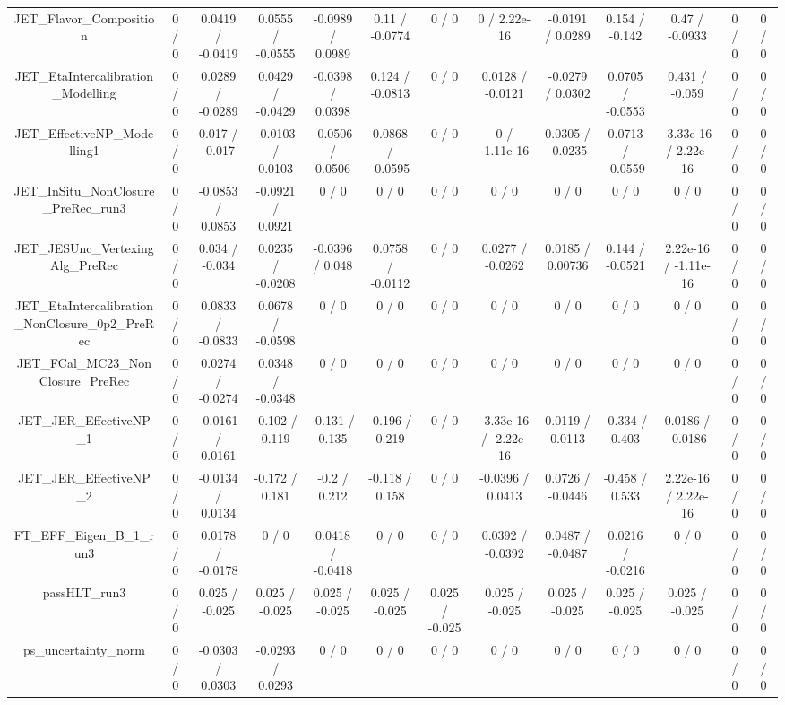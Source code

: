\documentclass[10pt]{article}
\begin{document}
\begin{table}[htbp]
\begin{center}
\begin{tabular}{|c|c|c|c|c|c|c|c|c|c|c|c|c|}
  JET_Flavor_Composition & 0 / 0 & 0.0419 / -0.0419 & 0.0555 / -0.0555 & -0.0989 / 0.0989 & 0.11 / -0.0774 & 0 / 0 & 0 / 2.22e-16 & -0.0191 / 0.0289 & 0.154 / -0.142 & 0.47 / -0.0933 & 0 / 0 & 0 / 0 \\ 
  JET_EtaIntercalibration_Modelling & 0 / 0 & 0.0289 / -0.0289 & 0.0429 / -0.0429 & -0.0398 / 0.0398 & 0.124 / -0.0813 & 0 / 0 & 0.0128 / -0.0121 & -0.0279 / 0.0302 & 0.0705 / -0.0553 & 0.431 / -0.059 & 0 / 0 & 0 / 0 \\ 
  JET_EffectiveNP_Modelling1 & 0 / 0 & 0.017 / -0.017 & -0.0103 / 0.0103 & -0.0506 / 0.0506 & 0.0868 / -0.0595 & 0 / 0 & 0 / -1.11e-16 & 0.0305 / -0.0235 & 0.0713 / -0.0559 & -3.33e-16 / 2.22e-16 & 0 / 0 & 0 / 0 \\ 
  JET_InSitu_NonClosure_PreRec_run3 & 0 / 0 & -0.0853 / 0.0853 & -0.0921 / 0.0921 & 0 / 0 & 0 / 0 & 0 / 0 & 0 / 0 & 0 / 0 & 0 / 0 & 0 / 0 & 0 / 0 & 0 / 0 \\ 
  JET_JESUnc_VertexingAlg_PreRec & 0 / 0 & 0.034 / -0.034 & 0.0235 / -0.0208 & -0.0396 / 0.048 & 0.0758 / -0.0112 & 0 / 0 & 0.0277 / -0.0262 & 0.0185 / 0.00736 & 0.144 / -0.0521 & 2.22e-16 / -1.11e-16 & 0 / 0 & 0 / 0 \\ 
  JET_EtaIntercalibration_NonClosure_0p2_PreRec & 0 / 0 & 0.0833 / -0.0833 & 0.0678 / -0.0598 & 0 / 0 & 0 / 0 & 0 / 0 & 0 / 0 & 0 / 0 & 0 / 0 & 0 / 0 & 0 / 0 & 0 / 0 \\ 
  JET_FCal_MC23_NonClosure_PreRec & 0 / 0 & 0.0274 / -0.0274 & 0.0348 / -0.0348 & 0 / 0 & 0 / 0 & 0 / 0 & 0 / 0 & 0 / 0 & 0 / 0 & 0 / 0 & 0 / 0 & 0 / 0 \\ 
  JET_JER_EffectiveNP_1 & 0 / 0 & -0.0161 / 0.0161 & -0.102 / 0.119 & -0.131 / 0.135 & -0.196 / 0.219 & 0 / 0 & -3.33e-16 / -2.22e-16 & 0.0119 / 0.0113 & -0.334 / 0.403 & 0.0186 / -0.0186 & 0 / 0 & 0 / 0 \\ 
  JET_JER_EffectiveNP_2 & 0 / 0 & -0.0134 / 0.0134 & -0.172 / 0.181 & -0.2 / 0.212 & -0.118 / 0.158 & 0 / 0 & -0.0396 / 0.0413 & 0.0726 / -0.0446 & -0.458 / 0.533 & 2.22e-16 / 2.22e-16 & 0 / 0 & 0 / 0 \\ 
  FT_EFF_Eigen_B_1_run3 & 0 / 0 & 0.0178 / -0.0178 & 0 / 0 & 0.0418 / -0.0418 & 0 / 0 & 0 / 0 & 0.0392 / -0.0392 & 0.0487 / -0.0487 & 0.0216 / -0.0216 & 0 / 0 & 0 / 0 & 0 / 0 \\ 
  passHLT_run3 & 0 / 0 & 0.025 / -0.025 & 0.025 / -0.025 & 0.025 / -0.025 & 0.025 / -0.025 & 0.025 / -0.025 & 0.025 / -0.025 & 0.025 / -0.025 & 0.025 / -0.025 & 0.025 / -0.025 & 0 / 0 & 0 / 0 \\ 
  ps_uncertainty_norm & 0 / 0 & -0.0303 / 0.0303 & -0.0293 / 0.0293 & 0 / 0 & 0 / 0 & 0 / 0 & 0 / 0 & 0 / 0 & 0 / 0 & 0 / 0 & 0 / 0 & 0 / 0 \\ 

\end{tabular}
\end{center}
\end{table}
\end{document}
